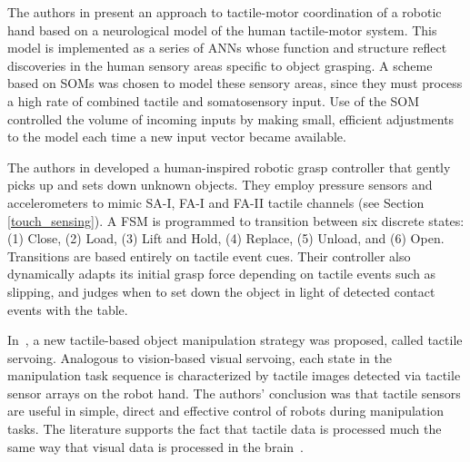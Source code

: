 
The authors in \cite{leoni1998implementing} present an approach to tactile-motor coordination of a robotic hand based on a neurological model of the human tactile-motor system.
This model is implemented as a series of ANNs whose function and structure reflect discoveries in the human sensory areas specific to object grasping.
A scheme based on SOMs was chosen to model these sensory areas, since they must process a high rate of combined tactile and somatosensory input.
Use of the SOM controlled the volume of incoming inputs by making small, efficient adjustments to the model each time a new input vector became available.

The authors in \cite{romano2011human} developed a human-inspired robotic grasp controller that gently picks up and sets down unknown objects.
They employ pressure sensors and accelerometers to mimic SA-I, FA-I and FA-II tactile channels (see Section \ref{touch_sensing}).
A FSM is programmed to transition between six discrete states: (1) Close, (2) Load, (3) Lift and Hold, (4) Replace, (5) Unload, and (6) Open.
Transitions are based entirely on tactile event cues.
Their controller also dynamically adapts its initial grasp force depending on tactile events such as slipping, and judges when to set down the object in light of detected contact events with the table.

In~\cite{sikka1994tactile}, a new tactile-based object manipulation strategy was proposed, called tactile servoing.
Analogous to vision-based visual servoing, each state in the manipulation task sequence is characterized by tactile images detected via tactile sensor arrays on the robot hand.
The authors' conclusion was that tactile sensors are useful in simple, direct and effective control of robots during manipulation tasks.
The literature supports the fact that tactile data is processed much the same way that visual data is processed in the brain~\cite{johansson2001eye, scilingo2004perception}.

